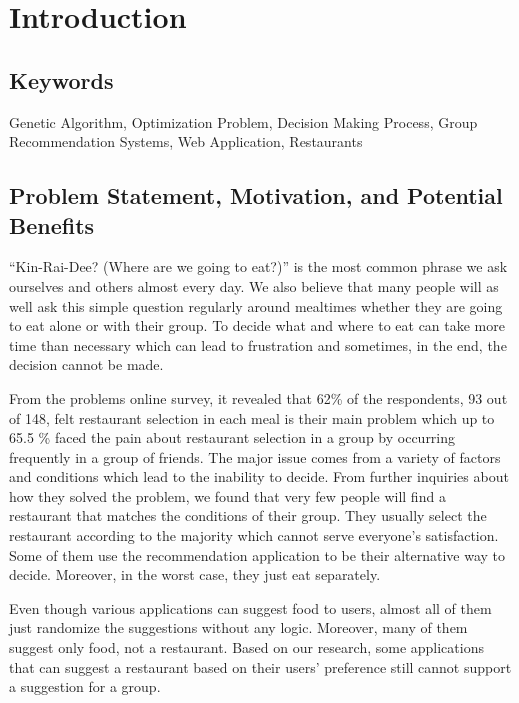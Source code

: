 \documentclass[12pt,oneside,openright,a4paper]{cpe-english-project}
\begin{document}



\chapter{Introduction}

\section{Keywords} 

Genetic Algorithm, Optimization Problem, Decision Making Process, Group Recommendation Systems, Web Application, Restaurants

\section{Problem Statement, Motivation, and Potential Benefits} 

“Kin-Rai-Dee? (Where are we going to eat?)” is the most common phrase we ask ourselves and others almost every day. We also believe that many people will as well ask this simple question regularly around mealtimes whether they are going to eat alone or with their group. To decide what and where to eat can take more time than necessary which can lead to frustration and sometimes, in the end, the decision cannot be made.

From the problems online survey, it revealed that 62\% of the respondents, 93 out of 148, felt restaurant selection in each meal is their main problem which up to 65.5 \% faced the pain about restaurant selection in a group by occurring frequently in a group of friends. The major issue comes from a variety of factors and conditions which lead to the inability to decide. From further inquiries about how they solved the problem, we found that very few people will find a restaurant that matches the conditions of their group. They usually select the restaurant according to the majority which cannot serve everyone’s satisfaction. Some of them use the recommendation application to be their alternative way to decide. Moreover, in the worst case, they just eat separately. 

Even though various applications can suggest food to users, almost all of them just randomize the suggestions without any logic. Moreover, many of them suggest only food, not a restaurant. Based on our research, some applications that can suggest a restaurant based on their users’ preference still cannot support a suggestion for a group.
\end{document}

